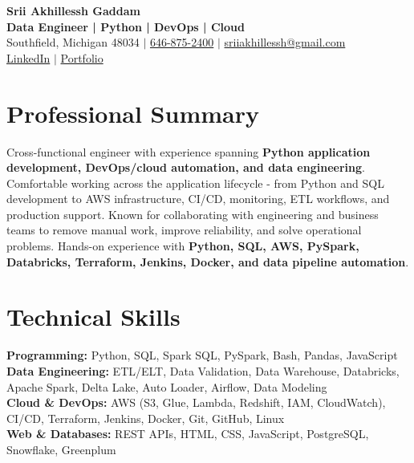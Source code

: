 \documentclass[letterpaper,10pt]{article}
\begin{document}
\fontsize{9.35pt}{10.45pt}\selectfont

\begin{center}
    {\LARGE \textbf{Srii Akhillessh Gaddam}} \\[-1pt]
    \textbf{Data Engineer | Python | DevOps | Cloud} \\[2pt]
    Southfield, Michigan 48034 $|$
    \href{tel:6468752400}{646-875-2400} $|$
    \href{mailto:sriiakhillessh@gmail.com}{sriiakhillessh@gmail.com} \\[1pt]
    \href{https://www.linkedin.com/in/srii-akhiilessh-gaddam-b48668191/}{LinkedIn} $|$
    \href{https://sriiakhillesshg.github.io/portfolio/}{Portfolio}
\end{center}
\vspace{-8pt}

\section{Professional Summary}
\small{Cross-functional engineer with experience spanning \textbf{Python application development, DevOps/cloud automation, and data engineering}. Comfortable working across the application lifecycle - from Python and SQL development to AWS infrastructure, CI/CD, monitoring, ETL workflows, and production support. Known for collaborating with engineering and business teams to remove manual work, improve reliability, and solve operational problems. Hands-on experience with \textbf{Python, SQL, AWS, PySpark, Databricks, Terraform, Jenkins, Docker, and data pipeline automation}.}

\section{Technical Skills}
\small{
\textbf{Programming:} Python, SQL, Spark SQL, PySpark, Bash, Pandas, JavaScript \\
\textbf{Data Engineering:} ETL/ELT, Data Validation, Data Warehouse, Databricks, Apache Spark, Delta Lake, Auto Loader, Airflow, Data Modeling \\
\textbf{Cloud \& DevOps:} AWS (S3, Glue, Lambda, Redshift, IAM, CloudWatch), CI/CD, Terraform, Jenkins, Docker, Git, GitHub, Linux \\
\textbf{Web \& Databases:} REST APIs, HTML, CSS, JavaScript, PostgreSQL, Snowflake, Greenplum
}
\end{document}
